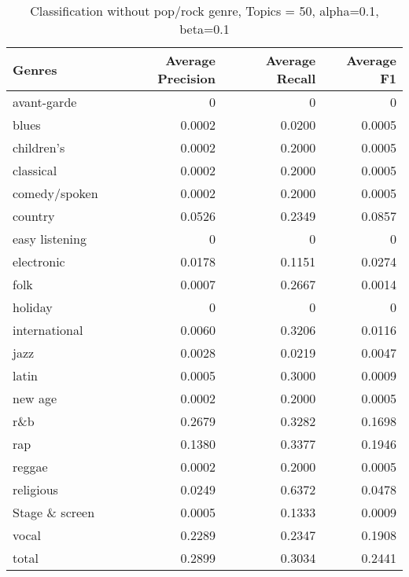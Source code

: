 \begin{table}[h!]
\begin{center}
\begin{tabular}{|l|r|r|r|}

\hline
\textbf{Genres} &  \textbf{Average Precision} & \textbf{Average Recall} & \textbf{Average F1} \\
\hline
avant-garde & 0 & 	0&	0\\
blues & 0.0002&	0.0200&	0.0005\\
children's & 0.0002&	0.2000	&0.0005\\
classical  & 0.0002	&0.2000&	0.0005\\
comedy/spoken & 0.0002&	0.2000	&0.0005\\
country  & 0.0526&	0.2349&	0.0857\\
easy listening & 0&	0&	0\\
electronic & 0.0178&	0.1151&	0.0274\\
folk & 0.0007&	0.2667	&0.0014\\
holiday & 0&	0&	0\\
international & 0.0060&	0.3206	&0.0116\\
jazz & 0.0028	&0.0219&	0.0047\\
latin & 0.0005&	0.3000&	0.0009\\
new age & 0.0002&	0.2000	&0.0005\\
r\&b & 0.2679&	0.3282&	0.1698\\
rap & 0.1380&	0.3377&	0.1946\\
reggae & 0.0002&	0.2000&	0.0005\\
religious & 0.0249&	0.6372&	0.0478\\
Stage \& screen & 0.0005	&0.1333	&0.0009\\
vocal & 0.2289	&0.2347	&0.1908\\
total& 0.2899 	&0.3034 &	0.2441\\
\hline
\end{tabular}
\caption{Classification without pop/rock genre, Topics = 50, alpha=0.1, beta=0.1}
\end{center}
\end{table}